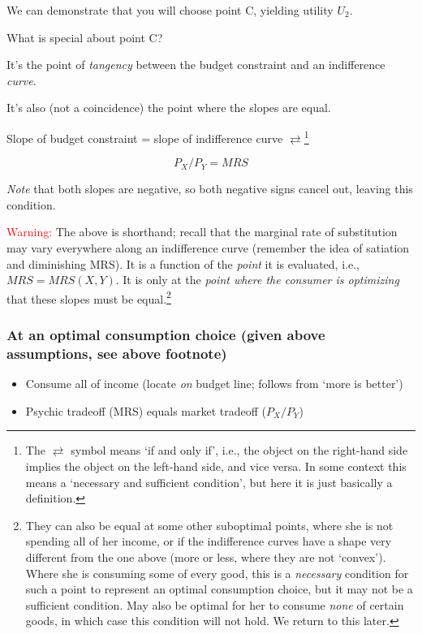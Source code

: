 \documentclass[]{article}
\providecommand{\tightlist}{%
  \setlength{\itemsep}{0pt}\setlength{\parskip}{0pt}}
\begin{document}
\bigskip

We can demonstrate that you will choose point C, yielding utility
\(U_2\).

What is special about point C?

It's the point of \emph{tangency} between the budget constraint and an
indifference \emph{curve}.

It's also (not a coincidence) the point where the slopes are equal.

\bigskip

Slope of budget constraint = slope of indifference curve
\(\rightleftarrows\)\footnote{The \(\rightleftarrow\) symbol means `if
  and only if', i.e., the object on the right-hand side implies the
  object on the left-hand side, and vice versa. In some context this
  means a `necessary and sufficient condition', but here it is just
  basically a definition.}

\[P_X/P_Y = MRS\]

\emph{Note} that both slopes are negative, so both negative signs cancel
out, leaving this condition.

\textcolor{red}{Warning:} The above is shorthand; recall that the
marginal rate of substitution may vary everywhere along an indifference
curve (remember the idea of satiation and diminishing MRS). It is a
function of the \emph{point} it is evaluated, i.e., \(MRS = MRS(X,Y)\).
It is only at the \emph{point where the consumer is optimizing} that
these slopes must be equal.\footnote{They can also be equal at some
  other suboptimal points, where she is not spending all of her income,
  or if the indifference curves have a shape very different from the one
  above (more or less, where they are not `convex'). Where she is
  consuming some of every good, this is a \emph{necessary} condition for
  such a point to represent an optimal consumption choice, but it may
  not be a sufficient condition. May also be optimal for her to consume
  \emph{none} of certain goods, in which case this condition will not
  hold. We return to this later.}

\hypertarget{at-an-optimal-consumption-choice-given-above-assumptions-see-above-footnote}{%
\subsubsection{At an optimal consumption choice (given above
assumptions, see above
footnote)}\label{at-an-optimal-consumption-choice-given-above-assumptions-see-above-footnote}}

\begin{itemize}
\tightlist
\item
  Consume all of income (locate \emph{on} budget line; follows from
  `more is better')
\item
  Psychic tradeoff (MRS) equals market tradeoff (\(P_X/P_Y\))
\end{itemize}
\end{document}

